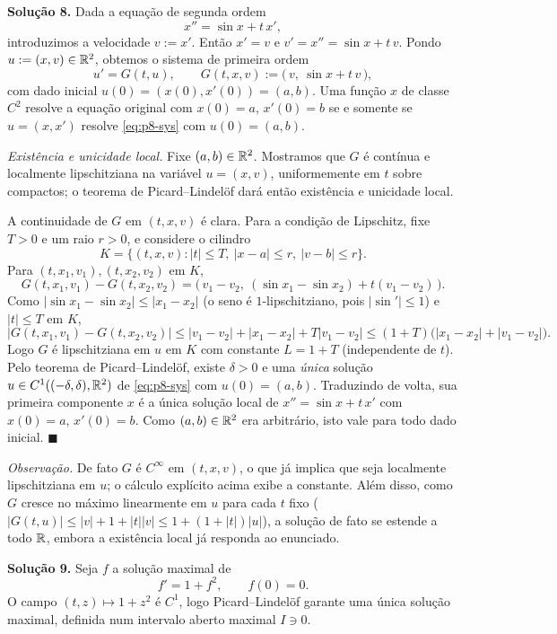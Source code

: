 \bigskip\noindent\textbf{Solução 8.}\quad
Dada a equação de segunda ordem
\[
x''=\sin x+t\,x',
\]
introduzimos a velocidade $v:=x'$. Então $x'=v$ e $v'=x''=\sin x+t\,v$. Pondo $u:=(x,v)\in\mathbb{R}^2$, obtemos o sistema de primeira ordem
\begin{equation}\label{eq:p8-sys}
u'=G(t,u),\qquad G(t,x,v):=\big(\,v,\ \sin x+t\,v\,\big),
\end{equation}
com dado inicial $u(0)=(x(0),x'(0))=(a,b)$. Uma função $x$ de classe $C^2$ resolve a equação original com $x(0)=a$, $x'(0)=b$ se e somente se $u=(x,x')$ resolve \eqref{eq:p8-sys} com $u(0)=(a,b)$.

\emph{Existência e unicidade local.} Fixe $(a,b)\in\mathbb{R}^2$. Mostramos que $G$ é contínua e localmente lipschitziana na variável $u=(x,v)$, uniformemente em $t$ sobre compactos; o teorema de Picard--Lindelöf dará então existência e unicidade local.

A continuidade de $G$ em $(t,x,v)$ é clara. Para a condição de Lipschitz, fixe $T>0$ e um raio $r>0$, e considere o cilindro
\[
K=\{(t,x,v):|t|\le T,\ |x-a|\le r,\ |v-b|\le r\}.
\]
Para $(t,x_1,v_1),(t,x_2,v_2)$ em $K$,
\[
G(t,x_1,v_1)-G(t,x_2,v_2)=\big(\,v_1-v_2,\ (\sin x_1-\sin x_2)+t(v_1-v_2)\,\big).
\]
Como $|\sin x_1-\sin x_2|\le|x_1-x_2|$ (o seno é $1$-lipschitziano, pois $|\sin'|\le1$) e $|t|\le T$ em $K$,
\[
\big|G(t,x_1,v_1)-G(t,x_2,v_2)\big|\le|v_1-v_2|+|x_1-x_2|+T|v_1-v_2|
\le(1+T)\big(|x_1-x_2|+|v_1-v_2|\big).
\]
Logo $G$ é lipschitziana em $u$ em $K$ com constante $L=1+T$ (independente de $t$). Pelo teorema de Picard--Lindelöf, existe $\delta>0$ e uma \emph{única} solução $u\in C^1((-\delta,\delta),\mathbb{R}^2)$ de \eqref{eq:p8-sys} com $u(0)=(a,b)$. Traduzindo de volta, sua primeira componente $x$ é a única solução local de $x''=\sin x+t\,x'$ com $x(0)=a$, $x'(0)=b$. Como $(a,b)\in\mathbb{R}^2$ era arbitrário, isto vale para todo dado inicial.
\qquad$\blacksquare$

\emph{Observação.} De fato $G$ é $C^\infty$ em $(t,x,v)$, o que já implica que seja localmente lipschitziana em $u$; o cálculo explícito acima exibe a constante. Além disso, como $G$ cresce no máximo linearmente em $u$ para cada $t$ fixo ($|G(t,u)|\le|v|+1+|t||v|\le 1+(1+|t|)|u|$), a solução de fato se estende a todo $\mathbb{R}$, embora a existência local já responda ao enunciado.


\bigskip\noindent\textbf{Solução 9.}\quad
Seja $f$ a solução maximal de
\[
f'=1+f^2,\qquad f(0)=0 .
\]
O campo $(t,z)\mapsto1+z^2$ é $C^1$, logo Picard--Lindelöf garante uma única solução maximal, definida num intervalo aberto maximal $I\ni0$.

